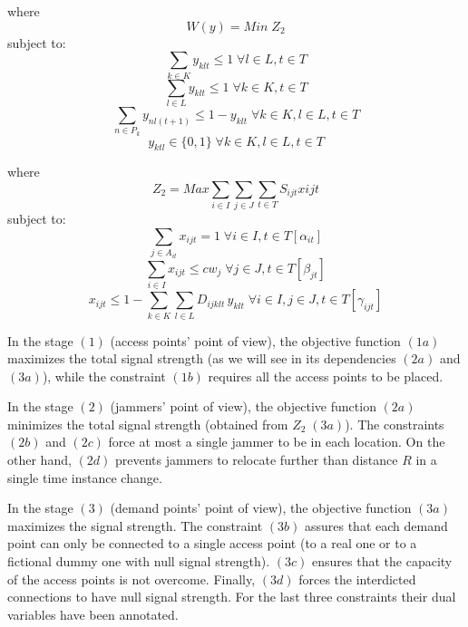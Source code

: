 \documentclass[runningheads]{llncs}
\begin{document}
where
\begin{equation}\tag{2a}
    W(y) = Min \; Z_2
\end{equation}
subject to:
\begin{equation}\tag{2b}
    \sum_{k \in K} y_{klt} \leq 1 \; \forall l \in L, t \in T
\end{equation}
\begin{equation}\tag{2c}
    \sum_{l \in L} y_{klt} \leq 1 \; \forall k \in K, t \in T
\end{equation}
\begin{equation}\tag{2d}
    \sum_{n \in P_k} y_{nl(t+1)} \leq 1-y_{klt} \; \forall k \in K, l \in L, t \in T
\end{equation}
\begin{equation}\tag{2e}
    y_{ktl} \in \{0,1\} \; \forall k\in K, l \in L, t \in T
\end{equation}

where
\begin{equation}\tag{3a}
\label{Eq3a}
    Z_2 = Max \sum_{i \in I} \sum_{j \in J} \sum_{t \in T} S_{ijt} x{ijt}
\end{equation}
subject to:
\begin{equation}\tag{3b}
    \sum_{j \in A_{it}} x_{ijt} = 1 \; \forall i \in I, t \in T [\alpha_{it}]
\end{equation}
\begin{equation}\tag{3c}
    \sum_{i \in I} x_{ijt} \leq cw_j \; \forall j \in J, t \in T [\beta_{jt}]
\end{equation}
\begin{equation}\tag{3d}
    x_{ijt} \leq 1 - \sum_{k \in K} \sum_{l \in L} D_{ijklt} \, y_{klt} \; \forall i \in I, j \in J, t \in T [\gamma_{ijt}]
\end{equation}
\normalsize

In the stage $(1)$ (access points' point of view), the objective function $(1a)$ maximizes the total signal strength (as we will see in its dependencies $(2a)$ and $(3a)$), while the constraint $(1b)$ requires all the access points to be placed.

In the stage $(2)$ (jammers' point of view), the objective function $(2a)$ minimizes the total signal strength (obtained from $Z_2 \; (3a)$). The constraints $(2b)$ and $(2c)$ force at most a single jammer to be in each location. On the other hand, $(2d)$ prevents jammers to relocate further than distance $R$ in a single time instance change.

In the stage $(3)$ (demand points' point of view), the objective function $(3a)$ maximizes the signal strength. The constraint $(3b)$ assures that each demand point can only be connected to a single access point (to a real one or to a fictional dummy one with null signal strength). $(3c)$ ensures that the capacity of the access points is not overcome. Finally, $(3d)$ forces the interdicted connections to have null signal strength. For the last three constraints their dual variables have been annotated.
\end{document}
